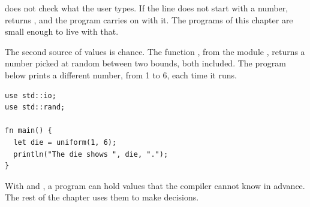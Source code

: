  does not check what the user types. If the line does not start
with a number,  returns , and the program carries on
with it. The
programs of this chapter are small enough to live with that.

The second source of values is chance. The function , from the
module , returns a number picked at random between two bounds,
both included. The program below prints a different number, from 1 to 6, each
time it runs.

\begin{lstlisting}[style=coloredverbatim, caption=Rolling a die, label=lst:control:die]
use std::io;
use std::rand;

fn main() {
  let die = uniform(1, 6);
  println("The die shows ", die, ".");
}
\end{lstlisting}

With  and , a program can hold values that the
compiler cannot know in advance. The rest of the chapter uses them to make
decisions.
